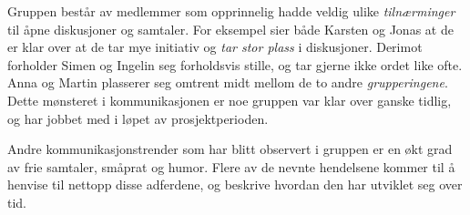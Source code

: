Gruppen består av medlemmer som opprinnelig hadde veldig ulike \textit{tilnærminger} til åpne diskusjoner og samtaler.
For eksempel sier både Karsten og Jonas at de er klar over at de tar mye initiativ og \textit{tar stor plass} i diskusjoner.
Derimot forholder Simen og Ingelin seg forholdsvis stille, og tar gjerne ikke ordet like ofte.
Anna og Martin plasserer seg omtrent midt mellom de to andre \textit{grupperingene}.
Dette mønsteret i kommunikasjonen er noe gruppen var klar over ganske tidlig, og har jobbet med i løpet av prosjektperioden.

Andre kommunikasjonstrender som har blitt observert i gruppen er en økt grad av frie samtaler, småprat og humor.
Flere av de nevnte hendelsene kommer til å henvise til nettopp disse adferdene, og beskrive hvordan den har utviklet seg over tid.










